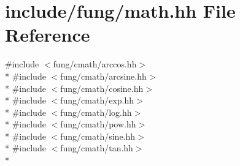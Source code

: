 \hypertarget{math_8hh}{}\section{include/fung/math.hh File Reference}
\label{math_8hh}
{\ttfamily \#include $<$fung/cmath/arccos.\+hh$>$}\\*
{\ttfamily \#include $<$fung/cmath/arcsine.\+hh$>$}\\*
{\ttfamily \#include $<$fung/cmath/cosine.\+hh$>$}\\*
{\ttfamily \#include $<$fung/cmath/exp.\+hh$>$}\\*
{\ttfamily \#include $<$fung/cmath/log.\+hh$>$}\\*
{\ttfamily \#include $<$fung/cmath/pow.\+hh$>$}\\*
{\ttfamily \#include $<$fung/cmath/sine.\+hh$>$}\\*
{\ttfamily \#include $<$fung/cmath/tan.\+hh$>$}\\*
